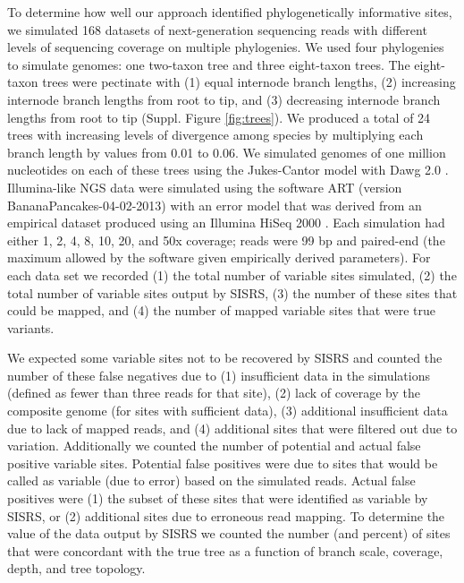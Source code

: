 \documentclass[11pt, oneside]{article}   	%
\begin{document}
To determine how well our approach identified phylogenetically informative sites, we simulated 168 datasets of next-generation sequencing reads with different levels of sequencing coverage on multiple phylogenies.
We used four phylogenies to simulate genomes: one two-taxon tree and three eight-taxon trees.
The eight-taxon trees were pectinate with (1) equal internode branch lengths, (2) increasing internode branch lengths from root to tip, and (3) decreasing internode branch lengths from root to tip (Suppl. Figure \ref{fig:trees}).
We produced a total of 24 trees with increasing levels of divergence among species by multiplying each branch length by values from 0.01 to 0.06.
We simulated genomes of one million nucleotides on each of these trees using the Jukes-Cantor model with Dawg 2.0 \citep{Cartwright2005,Jukes1969}. 
Illumina-like NGS data were simulated using the software ART (version BananaPancakes-04-02-2013) with an error model that was derived from an empirical dataset produced using an Illumina HiSeq 2000 \citep{Huang2012}.  
Each simulation had either 1, 2, 4, 8, 10, 20, and 50x coverage; reads were 99 bp and paired-end (the maximum allowed by the software given empirically derived parameters).
For each data set we recorded (1) the total number of variable sites simulated, (2) the total number of variable sites output by SISRS, (3) the number of these sites that could be mapped, and (4) the number of mapped variable sites that were true variants.

We expected some variable sites not to be recovered by SISRS and
counted the number of these false negatives due to (1) insufficient data in the simulations (defined as fewer than three reads for that site), (2) lack of coverage by the composite genome (for sites with sufficient data), (3) additional insufficient data due to lack of mapped reads, and (4) additional sites that were filtered out due to variation.
Additionally we counted the number of potential and actual false positive variable sites.
Potential false positives were due to sites that would be called as variable (due to error) based on the simulated reads.
Actual false positives were (1) the subset of these sites that were identified as variable by SISRS, or (2) additional sites due to erroneous read mapping.
To determine the value of the data output by SISRS we counted the number (and percent) of sites that were concordant with the true tree as a function of branch scale, coverage, depth, and tree topology.
\end{document}
